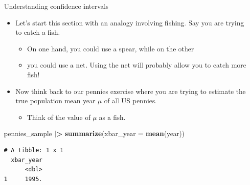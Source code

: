 \documentclass[
  ignorenonframetext,
]{beamer}
\newenvironment{Shaded}{\begin{snugshade}}{\end{snugshade}}
\newcommand{\AttributeTok}[1]{\textcolor[rgb]{0.13,0.29,0.53}{#1}}
\newcommand{\FunctionTok}[1]{\textcolor[rgb]{0.13,0.29,0.53}{\textbf{#1}}}
\newcommand{\NormalTok}[1]{#1}
\newcommand{\SpecialCharTok}[1]{\textcolor[rgb]{0.81,0.36,0.00}{\textbf{#1}}}
\providecommand{\tightlist}{%
  \setlength{\itemsep}{0pt}\setlength{\parskip}{0pt}}
\begin{document}
\begin{frame}[fragile]{Understanding confidence intervals}
\protect\hypertarget{understanding-confidence-intervals-1}{}
\begin{itemize}
\item
  Let's start this section with an analogy involving fishing. Say you
  are trying to catch a fish.

  \begin{itemize}
  \tightlist
  \item
    On one hand, you could use a spear, while on the other
  \item
    you could use a net. Using the net will probably allow you to catch
    more fish!
  \end{itemize}
\item
  Now think back to our pennies exercise where you are trying to
  estimate the true population mean year \(\mu\) of all US pennies.

  \begin{itemize}
  \tightlist
  \item
    Think of the value of \(\mu\) as a fish.
  \end{itemize}
\end{itemize}

\begin{Shaded}
\begin{Highlighting}[]
\NormalTok{pennies\_sample }\SpecialCharTok{|\textgreater{}} 
  \FunctionTok{summarize}\NormalTok{(}\AttributeTok{xbar\_year =} \FunctionTok{mean}\NormalTok{(year))}
\end{Highlighting}
\end{Shaded}

\begin{verbatim}
# A tibble: 1 x 1
  xbar_year
      <dbl>
1     1995.
\end{verbatim}
\end{frame}
\end{document}

